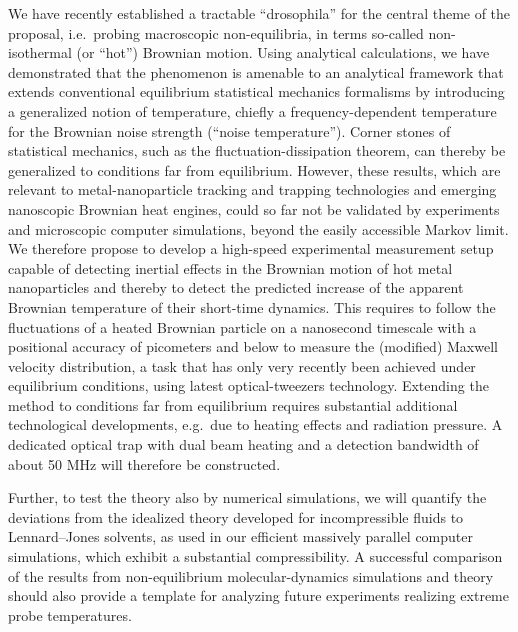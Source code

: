 \begin{workpackage}[id=WP_active,wphases=0-48,
  short=Active Particle Suspensions,%
  title=Probing Active Particle Suspensions with Colloids and Polymers,
  lead=Leipzig,
  LeipzigRM=12]
\begin{tasklist}
 \begin{task}[title=Noise Temperature,id=task2,PM=15,lead=Leipzig,wphases=12-42!0.5]    
   We have recently established a tractable ``drosophila'' for the central theme of the proposal, i.e.\ probing macroscopic non-equilibria, in terms so-called non-isothermal (or ``hot'') Brownian motion. 
   Using analytical calculations, we have demonstrated that the phenomenon is amenable to an analytical framework that extends conventional equilibrium statistical mechanics formalisms by introducing a generalized notion of temperature, chiefly a frequency-dependent temperature for the Brownian noise strength (``noise temperature''). 
   Corner stones of statistical mechanics, such as the fluctuation-dissipation theorem, can thereby be generalized to conditions far from equilibrium.
   However, these results, which are relevant to metal-nanoparticle tracking and trapping technologies and emerging nanoscopic Brownian heat engines, could so far not be validated by experiments and microscopic computer simulations, beyond the easily accessible Markov limit. 
   We therefore propose to develop a high-speed experimental measurement setup capable of detecting inertial effects in the Brownian motion of hot metal nanoparticles and thereby to detect the predicted increase of the apparent Brownian temperature of their short-time dynamics. 
   This requires to follow the fluctuations of a heated Brownian particle on a nanosecond timescale with a positional accuracy of picometers and below to measure the (modified) Maxwell velocity distribution, a task that has only very recently been achieved under equilibrium conditions, using latest optical-tweezers technology. 
   Extending the method to conditions far from equilibrium requires substantial additional technological developments, e.g.\ due to heating effects and radiation pressure. 
   A dedicated optical trap with dual beam heating and a detection bandwidth of about 50 MHz will therefore be constructed. 
      
Further, to test the theory also by numerical simulations, we will quantify the deviations from the idealized theory developed for incompressible fluids to Lennard--Jones solvents, as used in our efficient massively parallel computer simulations, which exhibit a substantial compressibility. 
   A successful comparison of the results from non-equilibrium molecular-dynamics simulations and theory should also provide a template for analyzing future experiments realizing extreme probe temperatures. 
\end{task}


\end{tasklist}
\end{workpackage}
